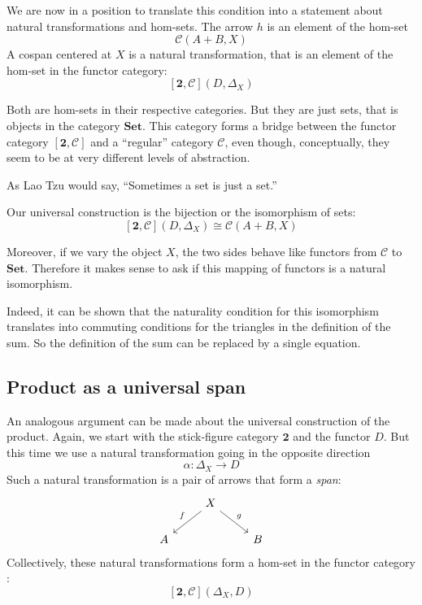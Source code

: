 \documentclass[DaoFP]{subfiles}
\begin{document}
We are now in a position to translate this condition into a statement about natural transformations and hom-sets. The arrow $h$ is an element of the hom-set 
\[ \mathcal{C}(A + B, X)\]
A cospan centered at $X$ is a natural transformation, that is an element of the hom-set in the functor category:
\[ [\mathbf{2}, \mathcal{C}](D, \Delta_X) \]

Both are hom-sets in their respective categories. But they are just sets, that is objects in the category $\mathbf{Set}$. This category forms a bridge between the functor category $[\mathbf{2}, \mathcal{C}]$ and a ``regular'' category $\mathcal{C}$, even though, conceptually, they seem to be at very different levels of abstraction. 

As Lao Tzu would say, ``Sometimes a set is just a set.''

Our universal construction is the bijection or the isomorphism of sets:
\[ [\mathbf{2}, \mathcal{C}](D, \Delta_X)  \cong \mathcal{C}(A + B, X) \]

Moreover, if we vary the object $X$, the two sides behave like functors from  $\mathcal{C}$ to $\mathbf{Set}$. Therefore it makes sense to ask if this mapping of functors is a natural isomorphism. 

Indeed, it can be shown that the naturality condition for this isomorphism translates into commuting conditions for the triangles in the definition of the sum. So the definition of the sum can be replaced by a single equation.

\subsection{Product as a universal span}

An analogous argument can be made about the universal construction of the product. Again, we start with the stick-figure category $\mathbf{2}$ and the functor $D$. But this time we use a natural transformation going in the opposite direction
\[ \alpha \colon \Delta_X \to D \]
Such a natural transformation is a pair of arrows that form a \emph{span}:
\[
 \begin{tikzcd}
 &X
 \arrow[dl, "f"']
 \arrow[dr, "g"]
 \\
 A
 && B
  \end{tikzcd}
\]
Collectively, these natural transformations form a hom-set in the functor category :
\[[\mathbf{2}, \mathcal{C}](\Delta_X, D) \]
\end{document}
